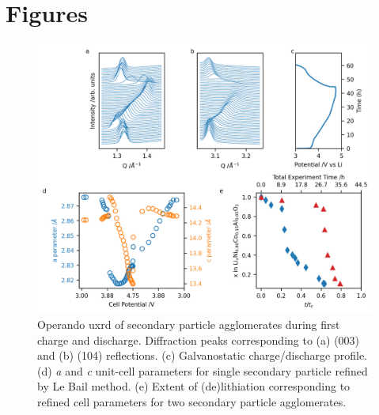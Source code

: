\documentclass{article}
\begin{document}
\section*{Figures}

\begin{figure}[!h]
  \includegraphics[width=\textwidth]{figures/NCA_xrd.png}
  \caption{Operando \gls{uxrd} of \nca{} secondary particle
    agglomerates during first charge and discharge. Diffraction peaks
    corresponding to (a) (003) and (b) (104) reflections. (c)
    Galvanostatic charge/discharge profile. (d) \textit{a} and
    \textit{c} unit-cell parameters for single secondary particle
    refined by Le Bail method. (e) Extent of (de)lithiation
    corresponding to refined cell parameters\cite{robert2015} for two
    secondary particle agglomerates.}
  \label{fig:uxrd}
\end{figure}
\end{document}

